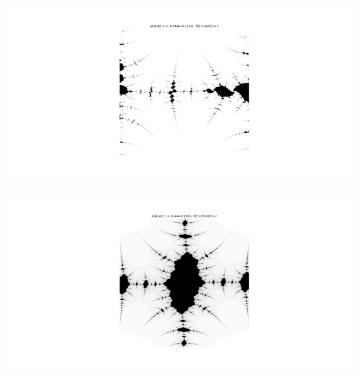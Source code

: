 \documentclass{article}
\begin{document}
\begin{figure}[h!]
  \centering
  \begin{subfigure}[b]{1\linewidth}
    \includegraphics[width=\linewidth]{Fractal_image/3sin(z)+c_-07444+01131.png}
  \end{subfigure}
  \begin{subfigure}[b]{1\linewidth}
    \includegraphics[width=\linewidth]{Fractal_image/3cos(z)+c_-0444+-01131.png}
  \end{subfigure}
\end{figure}

\newpage

\printbibliography[title = {References}]
\end{document}
